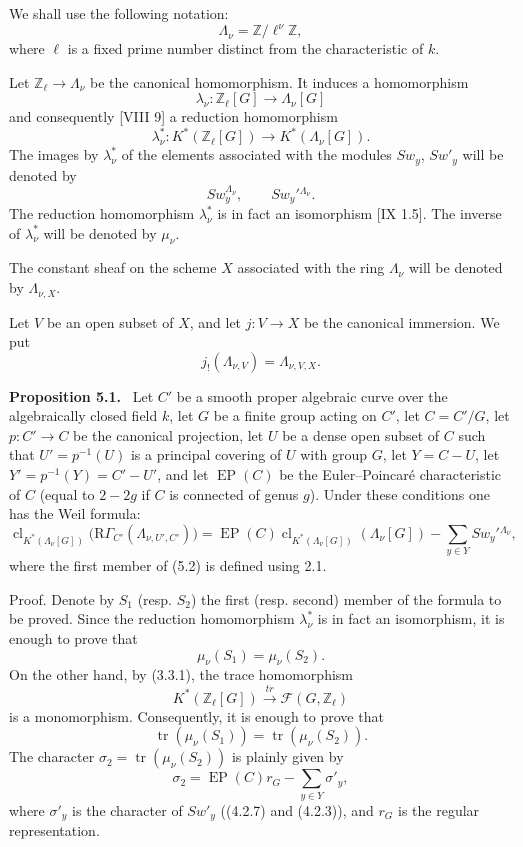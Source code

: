 \documentclass[11pt]{article}
\newenvironment{statement}[1]{\par\medskip\noindent\textbf{#1.}\ }{\par\medskip}
\providecommand{\EP}{\operatorname{EP}}
\providecommand{\EP}{\operatorname{EP}}
\providecommand{\clKstar}[1]{\operatorname{cl}_{K^*(#1)}}
\providecommand{\RG}{\mathrm R\Gamma}
\begin{document}
We shall use the following notation:
\[
\Lambda_\nu=\mathbb Z/\ell^\nu\mathbb Z,
\]
where $\ell$ is a fixed prime number distinct from the characteristic of $k$.

Let $\mathbb Z_\ell\to\Lambda_\nu$ be the canonical homomorphism. It induces a homomorphism
\[
\lambda_\nu:\mathbb Z_\ell[G]\longrightarrow \Lambda_\nu[G]
\]
and consequently [VIII 9] a reduction homomorphism
\[
\lambda_\nu^*:K^*(\mathbb Z_\ell[G])\longrightarrow K^*(\Lambda_\nu[G]).
\]
The images by $\lambda_\nu^*$ of the elements associated with the modules $Sw_y$, $Sw'_y$ will be denoted by
\[
Sw_y^{\Lambda_\nu},\qquad Sw_y'{}^{\Lambda_\nu}.
\]
The reduction homomorphism $\lambda_\nu^*$ is in fact an isomorphism [IX 1.5]. The inverse of $\lambda_\nu^*$ will be denoted by $\mu_\nu$.

The constant sheaf on the scheme $X$ associated with the ring $\Lambda_\nu$ will be denoted by $\Lambda_{\nu,X}$.

Let $V$ be an open subset of $X$, and let $j:V\to X$ be the canonical immersion. We put
\[
j_!(\Lambda_{\nu,V})=\Lambda_{\nu,V,X}.
\]

\begin{statement}{Proposition 5.1}
Let $C'$ be a smooth proper algebraic curve over the algebraically closed field $k$, let $G$ be a finite group acting on $C'$, let $C=C'/G$, let $p:C'\to C$ be the canonical projection, let $U$ be a dense open subset of $C$ such that $U'=p^{-1}(U)$ is a principal covering of $U$ with group $G$, let $Y=C-U$, let $Y'=p^{-1}(Y)=C'-U'$, and let $\EP(C)$ be the Euler--Poincaré characteristic of $C$ (equal to $2-2g$ if $C$ is connected of genus $g$).
Under these conditions one has the Weil formula:
\[
\clKstar{\Lambda_\nu[G]}\bigl(\RG_{C'}(\Lambda_{\nu,U',C'})\bigr)
=
\EP(C)\clKstar{\Lambda_\nu[G]}(\Lambda_\nu[G])
-\sum_{y\in Y}Sw_y'{}^{\Lambda_\nu},
\tag{5.2}
\]
where the first member of (5.2) is defined using 2.1.
\end{statement}

Proof. Denote by $S_1$ (resp. $S_2$) the first (resp. second) member of the formula to be proved. Since the reduction homomorphism $\lambda_\nu^*$ is in fact an isomorphism, it is enough to prove that
\[
\mu_\nu(S_1)=\mu_\nu(S_2).
\]
On the other hand, by (3.3.1), the trace homomorphism
\[
K^*(\mathbb Z_\ell[G])\xrightarrow{\ tr\ }\mathcal F(G,\mathbb Z_\ell)
\]
is a monomorphism. Consequently, it is enough to prove that
\[
\operatorname{tr}(\mu_\nu(S_1))=\operatorname{tr}(\mu_\nu(S_2)).
\]
The character $\sigma_2=\operatorname{tr}(\mu_\nu(S_2))$ is plainly given by
\[
\sigma_2=\EP(C)r_G-\sum_{y\in Y}\sigma'_y,
\tag{5.2.1}
\]
where $\sigma'_y$ is the character of $Sw'_y$ ((4.2.7) and (4.2.3)), and $r_G$ is the regular representation.
\end{document}
